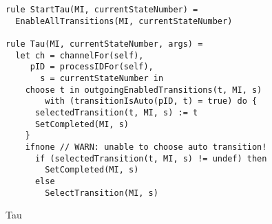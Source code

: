 \begin{listing}[H]
\begin{verbatim}
rule StartTau(MI, currentStateNumber) =
  EnableAllTransitions(MI, currentStateNumber)

rule Tau(MI, currentStateNumber, args) =
  let ch = channelFor(self),
     pID = processIDFor(self),
       s = currentStateNumber in
    choose t in outgoingEnabledTransitions(t, MI, s)
        with (transitionIsAuto(pID, t) = true) do {
      selectedTransition(t, MI, s) := t
      SetCompleted(MI, s)
    }
    ifnone // WARN: unable to choose auto transition!
      if (selectedTransition(t, MI, s) != undef) then
        SetCompleted(MI, s)
      else
        SelectTransition(MI, s)
\end{verbatim}
\caption{Tau}
\label{lst:asm:Tau}
\end{listing}




